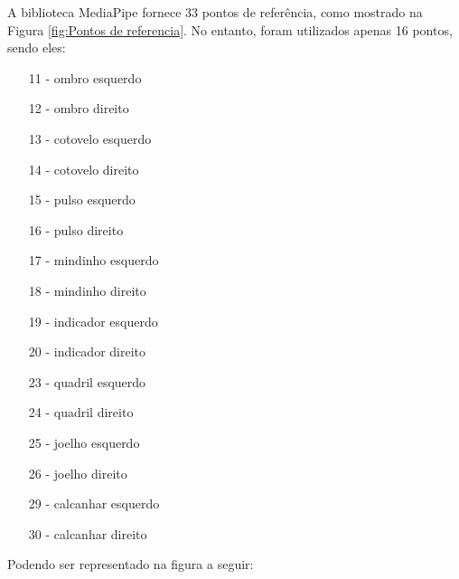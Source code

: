 A biblioteca MediaPipe fornece 33 pontos de referência, como mostrado na Figura \ref{fig:Pontos de referencia}. No entanto, foram utilizados apenas 16 pontos, sendo eles:

\begin{itemize}
    \item[11] - ombro esquerdo
    \item[12] - ombro direito
    \item[13] - cotovelo esquerdo
    \item[14] - cotovelo direito
    \item[15] - pulso esquerdo
    \item[16] - pulso direito
    \item[17] - mindinho esquerdo
    \item[18] - mindinho direito
    \item[19] - indicador esquerdo
    \item[20] - indicador direito
    \item[23] - quadril esquerdo
    \item[24] - quadril direito
    \item[25] - joelho esquerdo
    \item[26] - joelho direito
    \item[29] - calcanhar esquerdo
    \item[30] - calcanhar direito
\end{itemize}

\newpage
Podendo ser representado na figura a seguir:


